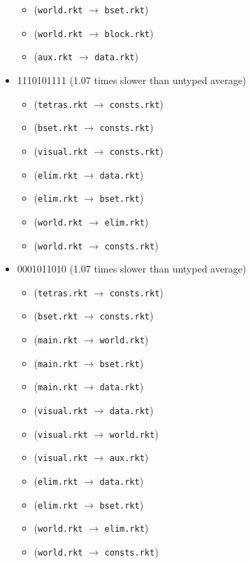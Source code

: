 \documentclass{article}
\newcommand{\mono}[1]{\texttt{#1}}
\begin{document}
\begin{itemize}
\begin{itemize}
  \item (\mono{world.rkt} $\rightarrow$ \mono{bset.rkt})
  \item (\mono{world.rkt} $\rightarrow$ \mono{block.rkt})
  \item (\mono{aux.rkt} $\rightarrow$ \mono{data.rkt})
  \end{itemize}
\item 1110101111 (1.07 times slower than untyped average)
  \begin{itemize}
  \item (\mono{tetras.rkt} $\rightarrow$ \mono{consts.rkt})
  \item (\mono{bset.rkt} $\rightarrow$ \mono{consts.rkt})
  \item (\mono{visual.rkt} $\rightarrow$ \mono{consts.rkt})
  \item (\mono{elim.rkt} $\rightarrow$ \mono{data.rkt})
  \item (\mono{elim.rkt} $\rightarrow$ \mono{bset.rkt})
  \item (\mono{world.rkt} $\rightarrow$ \mono{elim.rkt})
  \item (\mono{world.rkt} $\rightarrow$ \mono{consts.rkt})
  \end{itemize}
\item 0001011010 (1.07 times slower than untyped average)
  \begin{itemize}
  \item (\mono{tetras.rkt} $\rightarrow$ \mono{consts.rkt})
  \item (\mono{bset.rkt} $\rightarrow$ \mono{consts.rkt})
  \item (\mono{main.rkt} $\rightarrow$ \mono{world.rkt})
  \item (\mono{main.rkt} $\rightarrow$ \mono{bset.rkt})
  \item (\mono{main.rkt} $\rightarrow$ \mono{data.rkt})
  \item (\mono{visual.rkt} $\rightarrow$ \mono{data.rkt})
  \item (\mono{visual.rkt} $\rightarrow$ \mono{world.rkt})
  \item (\mono{visual.rkt} $\rightarrow$ \mono{aux.rkt})
  \item (\mono{elim.rkt} $\rightarrow$ \mono{data.rkt})
  \item (\mono{elim.rkt} $\rightarrow$ \mono{bset.rkt})
  \item (\mono{world.rkt} $\rightarrow$ \mono{elim.rkt})
  \item (\mono{world.rkt} $\rightarrow$ \mono{consts.rkt})
  \end{itemize}

\end{itemize}
\end{document}
